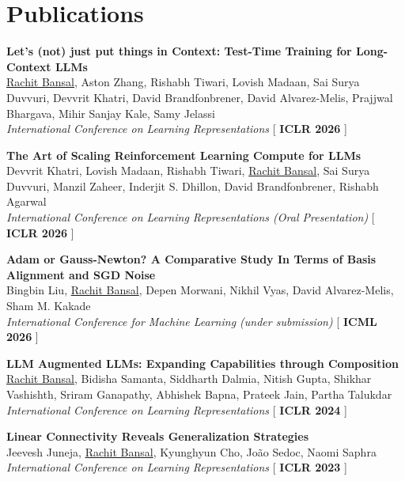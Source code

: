 \documentclass[10pt,letterpaper]{article}
\begin{document}
\section*{Publications}
\begin{enumerate}[label={[\arabic*]}]
    \item \textbf{Let's (not) just put things in Context: Test-Time Training for Long-Context LLMs} \\
    \underline{Rachit Bansal}, Aston Zhang, Rishabh Tiwari, Lovish Madaan, Sai Surya Duvvuri, Devvrit Khatri, David Brandfonbrener, David Alvarez-Melis, Prajjwal Bhargava, Mihir Sanjay Kale, Samy Jelassi \\
    \textit{International Conference on Learning Representations} \hfill [ \textbf{ICLR 2026} ]

    \item \textbf{The Art of Scaling Reinforcement Learning Compute for LLMs} \\
    Devvrit Khatri, Lovish Madaan, Rishabh Tiwari, \underline{Rachit Bansal}, Sai Surya Duvvuri, Manzil Zaheer, Inderjit S. Dhillon, David Brandfonbrener, Rishabh Agarwal \\
    \textit{International Conference on Learning Representations (Oral Presentation)} \hfill [ \textbf{ICLR 2026} ]

    \item \textbf{Adam or Gauss-Newton? A Comparative Study In Terms of Basis Alignment and SGD Noise} \\
    Bingbin Liu, \underline{Rachit Bansal}, Depen Morwani, Nikhil Vyas, David Alvarez-Melis, Sham M. Kakade \\
    \textit{International Conference for Machine Learning (under submission)} \hfill [ \textbf{ICML 2026} ]

    \item \textbf{LLM Augmented LLMs: Expanding Capabilities through Composition} \\
    \underline{Rachit Bansal}, Bidisha Samanta, Siddharth Dalmia, Nitish Gupta, Shikhar Vashishth, Sriram Ganapathy, Abhishek Bapna, Prateek Jain, Partha Talukdar \\
    \textit{International Conference on Learning Representations} \hfill [ \textbf{ICLR 2024} ]

    \item \textbf{Linear Connectivity Reveals Generalization Strategies} \\
    Jeevesh Juneja, \underline{Rachit Bansal}, Kyunghyun Cho, Jo\~ao Sedoc, Naomi Saphra \\
    \textit{International Conference on Learning Representations} \hfill [ \textbf{ICLR 2023} ]


\end{enumerate}
\end{document}
